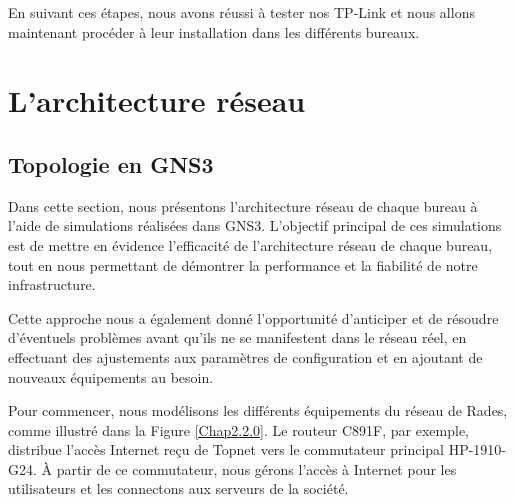 En suivant ces étapes, nous avons réussi à tester nos TP-Link et nous allons maintenant procéder à leur installation dans les différents bureaux. \\





\section{L'architecture réseau}

\subsection{Topologie en GNS3}


Dans cette section, nous présentons l'architecture réseau de chaque bureau à l'aide de simulations réalisées dans GNS3. L'objectif principal de ces simulations est de mettre en évidence l'efficacité de l'architecture réseau de chaque bureau, tout en nous permettant de démontrer la performance et la fiabilité de notre infrastructure. 

Cette approche nous a également donné l'opportunité d'anticiper et de résoudre d'éventuels problèmes avant qu'ils ne se manifestent dans le réseau réel, en effectuant des ajustements aux paramètres de configuration et en ajoutant de nouveaux équipements au besoin.

Pour commencer, nous modélisons les différents équipements du réseau de Rades, comme illustré dans la Figure \ref{Chap2.2.0}. Le routeur C891F, par exemple, distribue l'accès Internet reçu de Topnet vers le commutateur principal HP-1910-G24. À partir de ce commutateur, nous gérons l'accès à Internet pour les utilisateurs et les connectons aux serveurs de la société.

